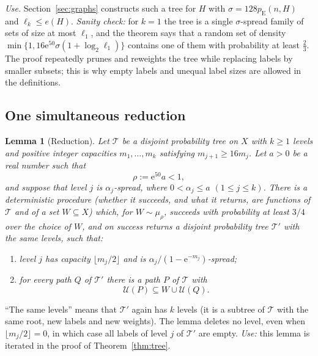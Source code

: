 \documentclass[11pt]{article}
\newtheorem{lemma}[theorem]{Lemma}
\numberwithin{equation}{section}
\newcommand{\pE}{p_{\mathrm E}}
\newcommand{\TT}{\mathcal T}
\newcommand{\UU}{\mathcal U}
\newcommand{\ee}{\mathrm e}
\begin{document}
\emph{Use.} Section~\ref{sec:graphs} constructs such a tree for $H$
with $\sigma=128\pE(n,H)$ and $\ell_k\le e(H)$. \emph{Sanity check:} for
$k=1$ the tree is a single $\sigma$-spread family of sets of size at
most $\ell_1$, and the theorem says that a random set of density
$\min\{1,16\ee^{50}\sigma(1+\log_2\ell_1)\}$ contains one of them with
probability at least $\frac23$. The proof repeatedly prunes and reweights the tree while
replacing labels by smaller subsets; this is why empty labels and
unequal label sizes are allowed in the definitions.

\subsection{One simultaneous reduction}

\begin{lemma}[Reduction]\label{lem:reduction}
Let $\TT$ be a disjoint probability tree on $X$ with $k\ge1$ levels and
positive integer capacities $m_1,\ldots,m_k$ satisfying
$m_{j+1}\ge16m_j$. Let $a>0$ be a real number such that
\[
 \rho:=\ee^{50}a<1,
\]
and suppose that level $j$ is $\alpha_j$-spread, where
$0<\alpha_j\le a$ $(1\le j\le k)$.
There is a deterministic procedure (whether it succeeds, and what it
returns, are functions of $\TT$ and of a set $W\subseteq X$) which, for
$W\sim\mu_\rho$, succeeds with probability at least $3/4$ over the
choice of $W$, and on success returns a disjoint probability tree
$\TT'$ with the same levels, such that:
\begin{enumerate}[label=(\roman*),leftmargin=2.2em,itemsep=3pt]
 \item level $j$ has capacity $\lfloor m_j/2\rfloor$ and is
 $\alpha_j/(1-\ee^{-m_j})$-spread;
 \item for every path $Q$ of $\TT'$ there is a path $P$ of $\TT$ with
 \begin{equation}\label{eq:recovery}
   \UU(P)\subseteq W\cup\UU(Q).
 \end{equation}
\end{enumerate}
\end{lemma}

``The same levels'' means that $\TT'$ again has $k$ levels (it is a
subtree of $\TT$ with the same root, new labels and new weights). The
lemma deletes no level, even when $\lfloor m_j/2\rfloor=0$, in which
case all labels of level $j$ of $\TT'$ are empty. \emph{Use:} this
lemma is iterated in the proof of Theorem~\ref{thm:tree}.
\end{document}
